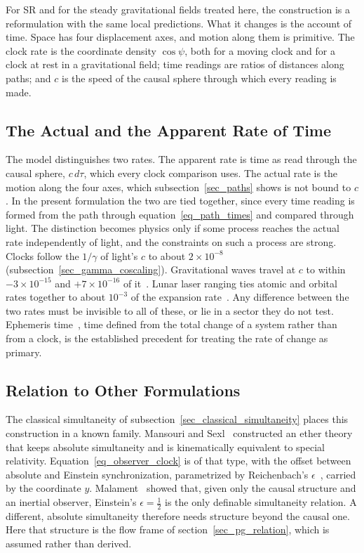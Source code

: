 \documentclass[anonymous]{iopjournal}
\begin{document}
For SR and for the steady gravitational fields treated here, the construction is a reformulation with the same local predictions. What it changes is the account of time. Space has four displacement axes, and motion along them is primitive. The clock rate is the coordinate density $\cos\psi$, both for a moving clock and for a clock at rest in a gravitational field; time readings are ratios of distances along paths; and $c$ is the speed of the causal sphere through which every reading is made.

\subsection{The Actual and the Apparent Rate of Time}\label{sec_two_rates}

The model distinguishes two rates. The apparent rate is time as read through the causal sphere, $c\,d\tau$, which every clock comparison uses. The actual rate is the motion along the four axes, which subsection~\ref{sec_paths} shows is not bound to $c$. In the present formulation the two are tied together, since every time reading is formed from the path through equation~\eqref{eq_path_times} and compared through light. The distinction becomes physics only if some process reaches the actual rate independently of light, and the constraints on such a process are strong. Clocks follow the $1/\gamma$ of light's $c$ to about $2\times10^{-8}$ (subsection~\ref{sec_gamma_coscaling}). Gravitational waves travel at $c$ to within $-3\times10^{-15}$ and $+7\times10^{-16}$ of it~\cite{GW170817GRB}. Lunar laser ranging ties atomic and orbital rates together to about $10^{-3}$ of the expansion rate~\cite{HofmannMuller2018}. Any difference between the two rates must be invisible to all of these, or lie in a sector they do not test. Ephemeris time~\cite{Barbour2009}, time defined from the total change of a system rather than from a clock, is the established precedent for treating the rate of change as primary.

\subsection{Relation to Other Formulations}\label{sec_relation}

The classical simultaneity of subsection~\ref{sec_classical_simultaneity} places this construction in a known family. Mansouri and Sexl~\cite{MansouriSexl1977} constructed an ether theory that keeps absolute simultaneity and is kinematically equivalent to special relativity. Equation~\eqref{eq_observer_clock} is of that type, with the offset between absolute and Einstein synchronization, parametrized by Reichenbach's $\epsilon$~\cite{Reichenbach1958}, carried by the coordinate $y$. Malament~\cite{Malament1977} showed that, given only the causal structure and an inertial observer, Einstein's $\epsilon=\tfrac12$ is the only definable simultaneity relation. A different, absolute simultaneity therefore needs structure beyond the causal one. Here that structure is the flow frame of section~\ref{sec_pg_relation}, which is assumed rather than derived.
\end{document}
